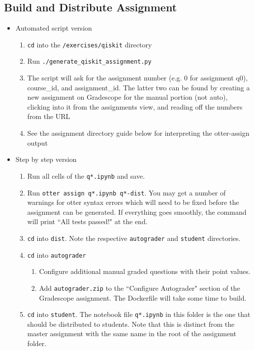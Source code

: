 \documentclass[12pt]{article}
\begin{document}
\subsection*{Build and Distribute Assignment}
\begin{itemize}
    \item Automated script version
    \begin{enumerate}[font=\bfseries]
        \item \texttt{cd} into the \texttt{/exercises/qiskit} directory
        \item Run \texttt{./generate\_qiskit\_assignment.py}
        \item The script will ask for the assignment number (e.g. 0 for assignment q0), course\_id, and assignment\_id. The latter two can be found by creating a new assignment on Gradescope for the manual portion (not auto), clicking into it from the assignments view, and reading off the numbers from the URL
        \item See the assignment directory guide below for interpreting the otter-assign output
    \end{enumerate}
    \item Step by step version
    \begin{enumerate}[font=\bfseries]
        \item Run all cells of the \texttt{q*.ipynb} and save.
        \item Run \texttt{otter assign q*.ipynb q*-dist}. You may get a number of warnings for otter syntax errors which will need to be fixed before the assignment can be generated. If everything goes smoothly, the command will print ``All tests passed!" at the end.
        \item \texttt{cd} into \texttt{dist}. Note the respective \texttt{autograder} and \texttt{student} directories.
        \item \texttt{cd} into \texttt{autograder}
        \begin{enumerate}
            \item Configure additional manual graded questions with their point values.
            \item Add \texttt{autograder.zip} to the ``Configure Autograder" section of the Gradescope assignment. The Dockerfile will take some time to build.
        \end{enumerate}
        \item \texttt{cd} into \texttt{student}. The notebook file \texttt{q*.ipynb} in this folder is the one that should be distributed to students. Note that this is distinct from the master assignment with the same name in the root of the assignment folder.
    \end{enumerate}
\end{itemize}
\end{document}
